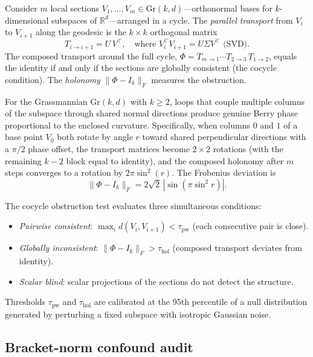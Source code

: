 \documentclass[11pt]{article}
\newcommand{\Gr}{\mathrm{Gr}}
\newcommand{\R}{\mathbb{R}}
\begin{document}
Consider $m$ local sections $V_1, \ldots, V_m \in \Gr(k,d)$---orthonormal
bases for $k$-dimensional subspaces of $\R^d$---arranged in a cycle. The
\emph{parallel transport} from $V_i$ to $V_{i+1}$ along the geodesic is
the $k \times k$ orthogonal matrix
\begin{equation}
T_{i \to i+1} = U \, V^\top, \quad
\text{where } V_i^\top V_{i+1} = U \Sigma V^\top \text{ (SVD)}.
\end{equation}
The composed transport around the full cycle,
$\Phi = T_{m \to 1} \cdots T_{2 \to 3} \, T_{1 \to 2}$,
equals the identity if and only if the sections are globally consistent
(the cocycle condition). The \emph{holonomy} $\|\Phi - I_k\|_F$ measures
the obstruction.

For the Grassmannian $\Gr(k,d)$ with $k \geq 2$, loops that couple
multiple columns of the subspace through shared normal directions produce
genuine Berry phase proportional to the enclosed curvature. Specifically,
when columns $0$ and $1$ of a base point $V_0$ both rotate by angle $r$
toward shared perpendicular directions with a $\pi/2$ phase offset, the
transport matrices become $2 \times 2$ rotations (with the remaining
$k-2$ block equal to identity), and the composed holonomy after $m$ steps
converges to a rotation by $2\pi \sin^2(r)$. The Frobenius deviation is
\begin{equation}\label{eq:berry}
\|\Phi - I_k\|_F = 2\sqrt{2}\,|\sin(\pi \sin^2 r)|.
\end{equation}

The cocycle obstruction test evaluates three simultaneous conditions:
\begin{itemize}
\item[\textbf{C1}] \emph{Pairwise consistent}: $\max_i d(V_i, V_{i+1}) < \tau_{\mathrm{pw}}$ (each consecutive pair is close).
\item[\textbf{C2}] \emph{Globally inconsistent}: $\|\Phi - I_k\|_F > \tau_{\mathrm{hol}}$ (composed transport deviates from identity).
\item[\textbf{C3}] \emph{Scalar blind}: scalar projections of the sections do not detect the structure.
\end{itemize}
Thresholds $\tau_{\mathrm{pw}}$ and $\tau_{\mathrm{hol}}$ are calibrated
at the 95th percentile of a null distribution generated by perturbing a
fixed subspace with isotropic Gaussian noise.

\subsection{Bracket-norm confound audit}
\end{document}
